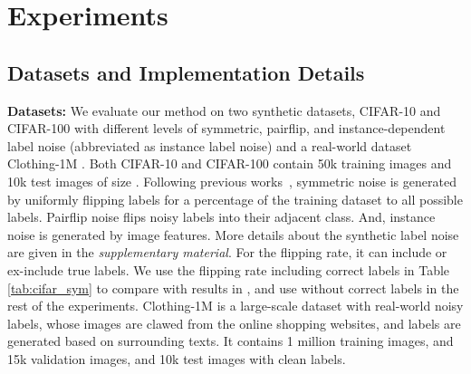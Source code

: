 \documentclass[11pt]{article}
\begin{document}
\section{Experiments}
\label{sec:exp}
\subsection{Datasets and Implementation Details}
\label{sec:impl}
\textbf{Datasets:} We evaluate our method on two synthetic datasets, CIFAR-10 and CIFAR-100 \cite{krizhevsky2009CIFAR} with different levels of symmetric, pairflip, and instance-dependent label noise (abbreviated as instance label noise) and a real-world dataset Clothing-1M \cite{Xiao2015Clothing}. Both CIFAR-10 and CIFAR-100 contain 50k training images and 10k test images of size . Following previous works~\cite{han2018co, xia2019anchor, Liu2020ELR, xia2021robust}, symmetric noise is generated by uniformly flipping labels for a percentage of the training dataset to all possible labels. Pairflip noise flips noisy labels into their adjacent class. And, instance noise is generated by image features. More details about the synthetic label noise are given in the \emph{supplementary material}. For the flipping rate, it can include \cite{han2018co, xia2019anchor} or ex-include \cite{Li2020DivideMix, Liu2020ELR} true labels. We use the flipping rate including correct labels in Table \ref{tab:cifar_sym} to compare with results in \cite{Li2020DivideMix}, and use without correct labels in the rest of the experiments. Clothing-1M \cite{Xiao2015Clothing} is a large-scale dataset with real-world noisy labels, whose images are clawed from the online shopping websites, and labels are generated based on surrounding texts. It contains 1 million training images, and 15k validation images, and 10k test images with clean labels. \\
\end{document}
